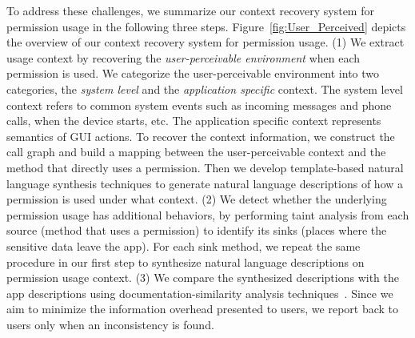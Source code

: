 To address these challenges, we summarize our context recovery system for permission usage in the following three steps.
Figure~\ref{fig:User_Perceived} depicts the overview of our context recovery system for permission usage.
(1) We extract usage context by recovering the \emph{user-perceivable environment} when each permission is used. We categorize the user-perceivable environment into two categories, the \emph{system level} and the \emph{application specific} context. The system level context refers to common system events such as incoming messages and phone calls, when the device starts, etc. The application specific context represents semantics of GUI actions. To recover the context information, we construct the call graph and build a mapping between the user-perceivable context and the method that directly uses a permission. Then we develop template-based natural language synthesis techniques to generate natural language descriptions of how a permission is used under what context.
(2) We detect whether the underlying permission usage has additional behaviors, by performing taint analysis from each source (method that uses a permission) to identify its sinks (places where the sensitive data leave the app). For each sink method, we repeat the same procedure in our first step to synthesize natural language descriptions on permission usage context.
(3) We compare the synthesized descriptions with the app descriptions using documentation-similarity analysis techniques~\cite{sensim, docsim}. Since we aim to minimize the information overhead presented to users, we report back to users only when an inconsistency is found.


